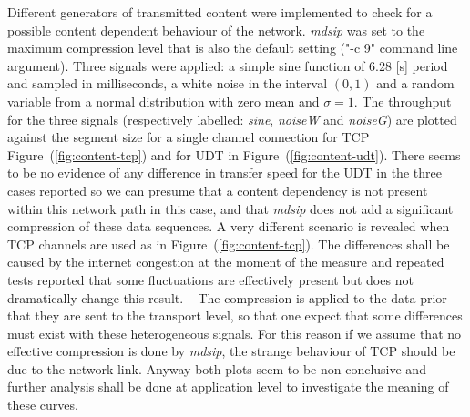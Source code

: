 \documentclass[10pt,a4paper]{article}
\begin{document}
Different generators of transmitted content were implemented to check for a possible content dependent behaviour of the network.
\emph{mdsip} was set to the maximum compression level that is also the default setting ("-c 9" command line argument).
Three signals were applied: a simple sine function of 6.28 [s] period and sampled in milliseconds, a white noise in the interval $(0,1)$ and a random variable from a normal distribution with zero mean and $\sigma=1$.
The throughput for the three signals (respectively labelled: \emph{sine}, \emph{noiseW} and \emph{noiseG}) are plotted against the segment size for a single channel connection for TCP Figure~(\ref{fig:content-tcp}) and for UDT in Figure~(\ref{fig:content-udt}).
There seems to be no evidence of any difference in transfer speed for the UDT in the three cases reported so we can presume that a content dependency is not present within this network path in this case, and that \emph{mdsip} does not add a significant compression of these data sequences. 
A very different scenario is revealed when TCP channels are used as in Figure~(\ref{fig:content-tcp}). 
The differences shall be caused by the internet congestion at the moment of the measure and repeated tests reported that some fluctuations are effectively present but does not dramatically change this result.
~
The compression is applied to the data prior that they are sent to the transport level, so that one expect that some differences must exist with these heterogeneous signals.
For this reason if we assume that no effective compression is done by \emph{mdsip}, the strange behaviour of TCP should be due to the network link.
Anyway both plots seem to be non conclusive and further analysis shall be done at application level to investigate the meaning of these curves. 

\end{document}
